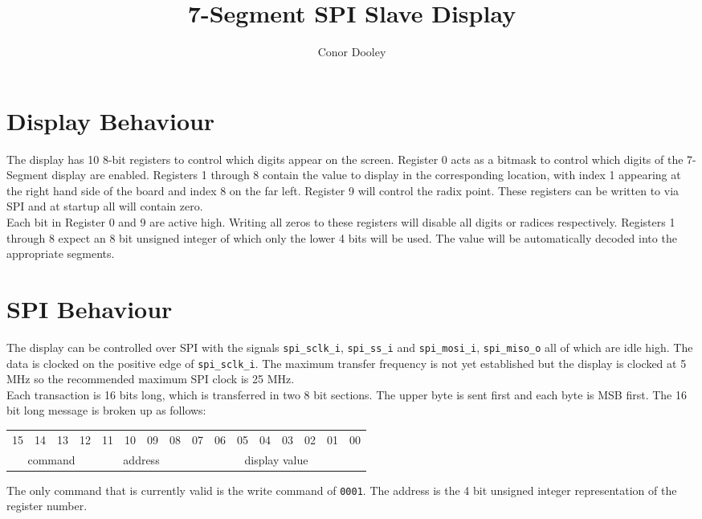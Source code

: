 \documentclass[a4paper,12pt]{article}
\begin{document}
\title{7-Segment SPI Slave Display}
\author{Conor Dooley}
\maketitle
\section*{Display Behaviour}
The display has 10 8-bit registers to control which digits appear on the screen. Register 0 acts as a bitmask to control which digits of the 7-Segment display are enabled. Registers 1 through 8 contain the value to display in the corresponding location, with index 1 appearing at the right hand side of the board and index 8 on the far left. Register 9 will control the radix point. These registers can be written to via SPI and at startup all will contain zero.\\
Each bit in Register 0 and 9 are active high. Writing all zeros to these registers will disable all digits or radices respectively.
Registers 1 through 8 expect an 8 bit unsigned integer of which only the lower 4 bits will be used. The value will be automatically decoded into the appropriate segments.
\section*{SPI Behaviour}
The display can be controlled over SPI with the signals \texttt{spi\_sclk\_i}, \texttt{spi\_ss\_i} and \texttt{spi\_mosi\_i}, \texttt{spi\_miso\_o} all of which are idle high. The data is clocked on the positive edge of \texttt{spi\_sclk\_i}. The maximum transfer frequency is not yet established but the display is clocked at 5 MHz so the recommended maximum SPI clock is 25 MHz.\\
Each transaction is 16 bits long, which is transferred in two 8 bit sections. The upper byte is sent first and each byte is MSB first. The 16 bit long message is broken up as follows:
\begin{table}[!h]
	\begin{center} 
		\begin{tabular}{|c|c|c|c| c|c|c|c| c|c|c|c| c|c|c|c|}
			15 & 14 & 13 & 12 & 11 & 10 & 09 & 08 & 07 & 06 & 05 & 04 & 03 & 02 & 01 & 00 \\
			\multicolumn{4}{|c|}{command} & \multicolumn{4}{c|}{address} & \multicolumn{8}{c|}{display value}			
		\end{tabular}
	\end{center}
\end{table}
The only command that is currently valid is the write command of \texttt{0001}. The address is the 4 bit unsigned integer representation of the register number.


	
\end{document}
